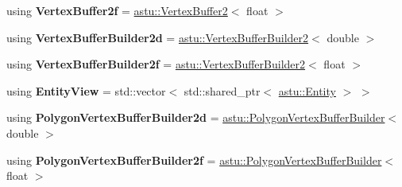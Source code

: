 \begin{DoxyCompactItemize}
\item 
\mbox{\label{namespaceastu_a081cf45a441eef100dfbb1e0f64c3826}} 
using {\bfseries Vertex\+Buffer2f} = \hyperlink{classastu_1_1VertexBuffer2}{astu\+::\+Vertex\+Buffer2}$<$ float $>$
\item 
\mbox{\label{namespaceastu_a91f7837593de4dabdf0abf59d5fa1889}} 
using {\bfseries Vertex\+Buffer\+Builder2d} = \hyperlink{classastu_1_1VertexBufferBuilder2}{astu\+::\+Vertex\+Buffer\+Builder2}$<$ double $>$
\item 
\mbox{\label{namespaceastu_a45033e159deced790d4dc3968ad8e878}} 
using {\bfseries Vertex\+Buffer\+Builder2f} = \hyperlink{classastu_1_1VertexBufferBuilder2}{astu\+::\+Vertex\+Buffer\+Builder2}$<$ float $>$
\item 
\mbox{\label{namespaceastu_ace2fb790b86c3908a65e4222f7ac2f4e}} 
using {\bfseries Entity\+View} = std\+::vector$<$ std\+::shared\+\_\+ptr$<$ \hyperlink{classastu_1_1Entity}{astu\+::\+Entity} $>$ $>$
\item 
\mbox{\label{namespaceastu_af904b09cd80425343c61f05969aee7a6}} 
using {\bfseries Polygon\+Vertex\+Buffer\+Builder2d} = \hyperlink{classastu_1_1PolygonVertexBufferBuilder}{astu\+::\+Polygon\+Vertex\+Buffer\+Builder}$<$ double $>$
\item 
\mbox{\label{namespaceastu_a7c96af258216d77915c6b4970969007b}} 
using {\bfseries Polygon\+Vertex\+Buffer\+Builder2f} = \hyperlink{classastu_1_1PolygonVertexBufferBuilder}{astu\+::\+Polygon\+Vertex\+Buffer\+Builder}$<$ float $>$
\end{DoxyCompactItemize}
